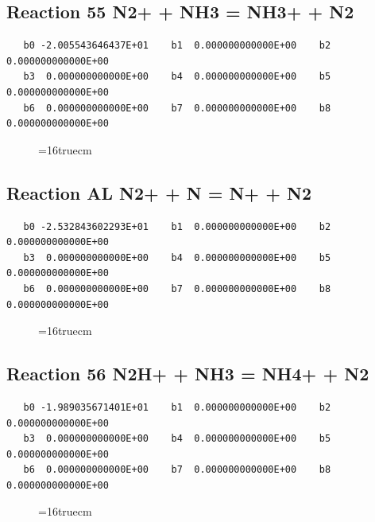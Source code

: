 \documentclass[12pt,dvipdfm]{article}
\begin{document}
\subsection{
Reaction 55 N2+ + NH3 = NH3+ + N2}
\begin{small}\begin{verbatim}
   b0 -2.005543646437E+01    b1  0.000000000000E+00    b2  0.000000000000E+00
   b3  0.000000000000E+00    b4  0.000000000000E+00    b5  0.000000000000E+00
   b6  0.000000000000E+00    b7  0.000000000000E+00    b8  0.000000000000E+00
   \end{verbatim}\end{small}
\begin{figure}[h!]
\label{n2rates}
\epsfxsize=16truecm
\end{figure}
\newpage

\subsection{
Reaction AL N2+ + N = N+ + N2}
\begin{small}\begin{verbatim}
   b0 -2.532843602293E+01    b1  0.000000000000E+00    b2  0.000000000000E+00
   b3  0.000000000000E+00    b4  0.000000000000E+00    b5  0.000000000000E+00
   b6  0.000000000000E+00    b7  0.000000000000E+00    b8  0.000000000000E+00
   \end{verbatim}\end{small}
\begin{figure}[h!]
\label{n2rates}
\epsfxsize=16truecm
\end{figure}
\newpage

\subsection{
Reaction 56 N2H+ + NH3 = NH4+ + N2}
\begin{small}\begin{verbatim}
   b0 -1.989035671401E+01    b1  0.000000000000E+00    b2  0.000000000000E+00
   b3  0.000000000000E+00    b4  0.000000000000E+00    b5  0.000000000000E+00
   b6  0.000000000000E+00    b7  0.000000000000E+00    b8  0.000000000000E+00
   \end{verbatim}\end{small}
\begin{figure}[h!]
\label{n2rates}
\epsfxsize=16truecm
\end{figure}
\newpage
\end{document}
